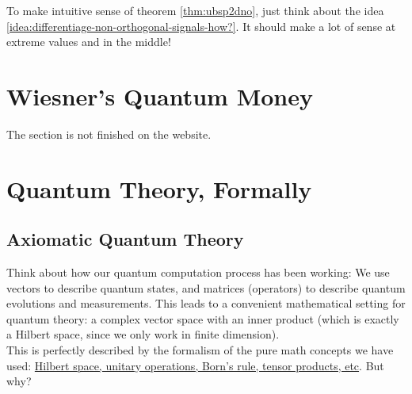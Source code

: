 \documentclass[12pt]{article}
\begin{document}
\begin{remark}
To make intuitive sense of theorem \ref{thm:ubsp2dno}, just think about the idea \ref{idea:differentiage-non-orthogonal-signals-how?}. It should make a lot of sense at extreme values and in the middle!
\end{remark}

\section{Wiesner's Quantum Money}
The section is not finished on the website.

\section{Quantum Theory, Formally}
\subsection{Axiomatic Quantum Theory}
\begin{idea}
Think about how our quantum computation process has been working: We use vectors to describe quantum states, and matrices (operators) to describe quantum evolutions and measurements. This leads to a convenient mathematical setting for quantum theory: a complex vector space with an inner product (which is exactly a Hilbert space, since we only work in finite dimension).\\

\noindent This is perfectly described by the formalism of the pure math concepts we have used: \underline{Hilbert space, unitary operations, Born's rule, tensor products, etc}. But why?
\end{idea}
\end{document}
